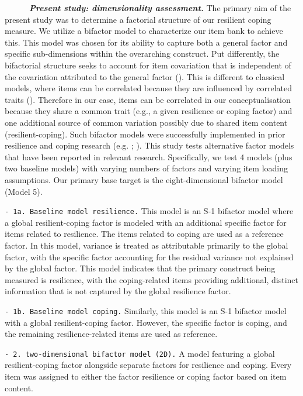 \documentclass[
  man,floatsintext]{apa7}
\begin{document}
~~~~~~\textbf{\emph{Present study: dimensionality assessment.}} The primary aim of the present study was to determine a factorial structure of our resilient coping measure. We utilize a bifactor model to characterize our item bank to achieve this. This model was chosen for its ability to capture both a general factor and specific sub-dimensions within the overarching construct. Put differently, the bifactorial structure seeks to account for item covariation that is independent of the covariation attributed to the general factor (). This is different to classical models, where items can be correlated because they are influenced by correlated traits (). Therefore in our case, items can be correlated in our conceptualisation because they share a common trait (e.g., a given resilience or coping factor) and one additional source of common variation possibly due to shared item content (resilient-coping). Such bifactor models were successfully implemented in prior resilience and coping research (e.g. ; ). This study tests alternative factor models that have been reported in relevant research. Specifically, we test 4 models (plus two baseline models) with varying numbers of factors and varying item loading assumptions. Our primary base target is the eight-dimensional bifactor model (Model 5).

\texttt{-\ 1a.\ Baseline\ model\ resilience.} This model is an S-1 bifactor model where a global resilient-coping factor is modeled with an additional specific factor for items related to resilience. The items related to coping are used as a reference factor. In this model, variance is treated as attributable primarily to the global factor, with the specific factor accounting for the residual variance not explained by the global factor. This model indicates that the primary construct being measured is resilience, with the coping-related items providing additional, distinct information that is not captured by the global resilience factor.

\texttt{-\ 1b.\ Baseline\ model\ coping.} Similarly, this model is an S-1 bifactor model with a global resilient-coping factor. However, the specific factor is coping, and the remaining resilience-related items are used as reference.

\texttt{-\ 2.\ two-dimensional\ bifactor\ model\ (2D).} A model featuring a global resilient-coping factor alongside separate factors for resilience and coping. Every item was assigned to either the factor resilience or coping factor based on item content.
\end{document}
